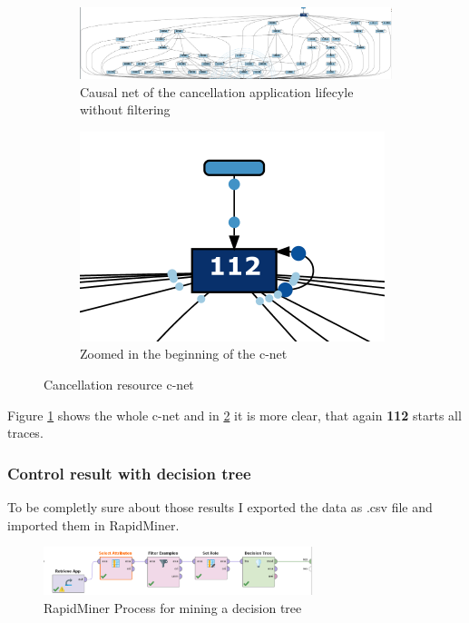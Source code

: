 \begin{figure}[!htbp]
\centering
\begin{subfigure}{0.7\textwidth}
\includegraphics[width = 0.9\linewidth]{CancCNet.PNG}
\caption{Causal net of the cancellation application lifecyle without filtering}
\label{fig:CnetCanc}
\end{subfigure}
\begin{subfigure}{0.2\textwidth}
\includegraphics[width = 0.9\linewidth]{CancCnetBeg.PNG}
\caption{Zoomed in the beginning of the c-net}
\label{fig:CnetCancZoome}
\end{subfigure}
\caption{Cancellation resource c-net}
\label{fig:CnetCancto}
\end{figure}

Figure \ref{fig:CnetCanc} shows the whole c-net and in \ref{fig:CnetCancZoome} it is more clear, that again \textbf{112} starts all traces.

\subsubsection{Control result with decision tree}

To be completly sure about those results I exported the data as .csv file and imported them in RapidMiner. 

\begin{figure}[!htbp]
\centering
\includegraphics[width =0.7\textwidth]{Decision.PNG}
\caption{RapidMiner Process for mining a decision tree}
\label{fig:dec}
\end{figure}

